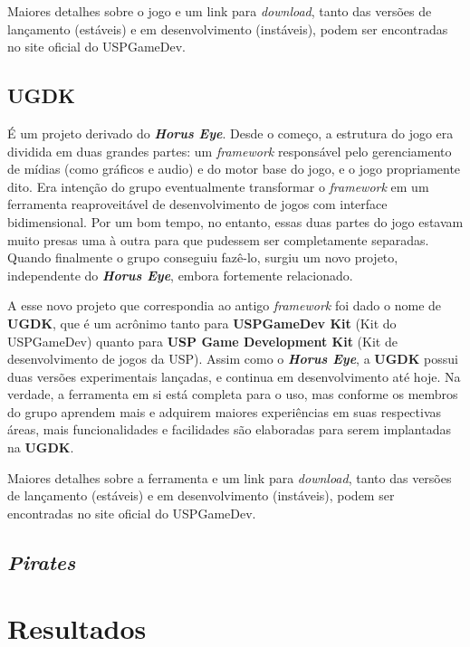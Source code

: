 \documentclass[12pt,onecolumn,a4paper]{article}
\begin{document}
        Maiores detalhes sobre o jogo e um link para \textit{download}, tanto das versões de
        lançamento (estáveis) e em desenvolvimento (instáveis), podem ser encontradas no site
        oficial do USPGameDev.
    
    \subsection{UGDK}
        É um projeto derivado do \textit{\textbf{Horus Eye}}. Desde o começo, a estrutura do jogo
        era dividida em duas grandes partes: um \textit{framework} responsável pelo gerenciamento
        de mídias (como gráficos e audio) e do motor base do jogo, e o jogo propriamente dito. Era
        intenção do grupo eventualmente transformar o \textit{framework} em um ferramenta
        reaproveitável de desenvolvimento de jogos com interface bidimensional. Por um bom tempo, no
        entanto, essas duas partes do jogo estavam muito presas uma à outra para que pudessem ser
        completamente separadas. Quando finalmente o grupo conseguiu fazê-lo, surgiu um novo
        projeto, independente do \textit{\textbf{Horus Eye}}, embora fortemente relacionado.
        
        A esse novo projeto que correspondia ao antigo \textit{framework} foi dado o nome de
        \textbf{UGDK}, que é um acrônimo tanto para \textbf{USPGameDev Kit} (Kit do USPGameDev)
        quanto para \textbf{USP Game Development Kit} (Kit de desenvolvimento de jogos da USP).
        Assim como o \textit{\textbf{Horus Eye}}, a \textbf{UGDK} possui duas versões experimentais
        lançadas, e continua em desenvolvimento até hoje. Na verdade, a ferramenta em si está
        completa para o uso, mas conforme os membros do grupo aprendem mais e adquirem maiores
        experiências em suas respectivas áreas, mais funcionalidades e facilidades são elaboradas
        para serem implantadas na \textbf{UGDK}.
        
        Maiores detalhes sobre a ferramenta e um link para \textit{download}, tanto das versões de
        lançamento (estáveis) e em desenvolvimento (instáveis), podem ser encontradas no site
        oficial do USPGameDev.
    
    \subsection{\textit{Pirates}}
        
    


\section{\LARGE Resultados}

\end{document}
